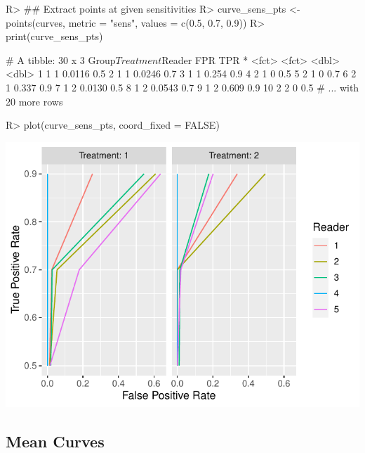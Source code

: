 \documentclass[
]{jss}
\begin{document}
\begin{CodeChunk}
\begin{CodeInput}
R> ## Extract points at given sensitivities
R> curve_sens_pts <- points(curves, metric = "sens", values = c(0.5, 0.7, 0.9))
R> print(curve_sens_pts)
\end{CodeInput}
\begin{CodeOutput}
# A tibble: 30 x 3
   Group$Treatment $Reader    FPR   TPR
 * <fct>           <fct>    <dbl> <dbl>
 1 1               1       0.0116   0.5
 2 1               1       0.0246   0.7
 3 1               1       0.254    0.9
 4 2               1       0        0.5
 5 2               1       0        0.7
 6 2               1       0.337    0.9
 7 1               2       0.0130   0.5
 8 1               2       0.0543   0.7
 9 1               2       0.609    0.9
10 2               2       0        0.5
# ... with 20 more rows
\end{CodeOutput}
\begin{CodeInput}
R> plot(curve_sens_pts, coord_fixed = FALSE)
\end{CodeInput}


\begin{center}\includegraphics{MRMCaov_files/figure-latex/using_curves_points-2} \end{center}

\end{CodeChunk}

\hypertarget{mean-curves}{%
\subsection{Mean Curves}\label{mean-curves}}
\end{document}
